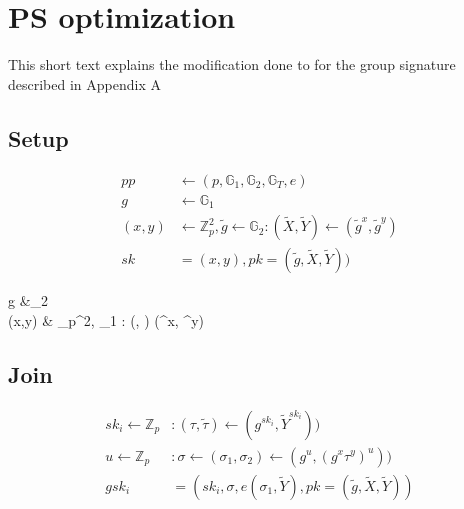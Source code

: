 \documentclass[11pt]{article}
\newenvironment{optimization}{\par\color{blue}}{\par}
\begin{document}
    \section{PS optimization}
    This short text explains the modification done to \cite{pointcheval2016short} for the group signature described in Appendix A

    \subsection{Setup}
    \begin{align}
        pp  & \leftarrow (p,\mathbb{G}_1,\mathbb{G}_2,\mathbb{G}_T,e) \\
        g &\leftarrow \mathbb{G}_1\\
        (x,y) &  \leftarrow \mathbb{Z}_p^{2}, \tilde{g} \leftarrow \mathbb{G}_2 :
        (\tilde{X}, \tilde{Y})  \leftarrow (\tilde{g}^x, \tilde{g}^y)\\
        sk &=(x,y), pk=(\tilde{g}, \tilde{X}, \tilde{Y}))
    \end{align}
    \begin{optimization}
        g &\leftarrow {}_2\\
        (x,y) &  \leftarrow {}_p^{2},  \leftarrow {}_1 :
        (, )  \leftarrow (^x, ^y)
    \end{optimization}

    \subsection{Join}
    \begin{align}
        sk_i \leftarrow \mathbb{Z}_p &:
        (\tau, \tilde{\tau})\leftarrow (g^{sk_i}, \tilde{Y}^{sk_i}))\\
        u \leftarrow \mathbb{Z}_p &: \sigma \leftarrow(\sigma_1, \sigma_2) \leftarrow (g^u, (g^x \tau^y )^u))\\
        gsk_i &=(sk_i,\sigma, e(\sigma_1, \tilde{Y}), pk=(\tilde{g}, \tilde{X}, \tilde{Y}))
    \end{align}
\end{document}
